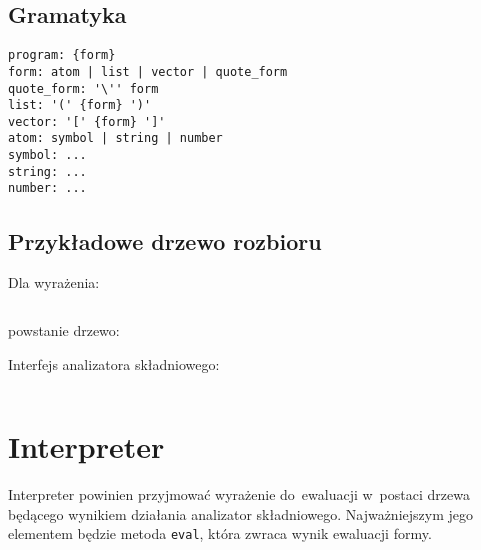 \documentclass[a4paper,11pt]{article}
\newcommand{\clj}[1]{\inputminted[fontsize=\footnotesize]{clojure}{code/#1.clj}}
\newcommand{\impl}[1]{\inputminted[fontsize=\footnotesize]{java}{impl/#1.java}}
\begin{document}
\subsection{Gramatyka}

\begin{verbatim}
program: {form}
form: atom | list | vector | quote_form
quote_form: '\'' form
list: '(' {form} ')'
vector: '[' {form} ']'
atom: symbol | string | number
symbol: ...
string: ...
number: ...
\end{verbatim}

\subsection{Przykładowe drzewo rozbioru}

Dla wyrażenia:
\clj{fact}

powstanie drzewo:



Interfejs analizatora składniowego:
\impl{Parser}

\section{Interpreter}

Interpreter powinien przyjmować wyrażenie do~ewaluacji w~postaci drzewa
będącego wynikiem działania analizator składniowego. Najważniejszym jego
elementem będzie metoda \verb+eval+, która zwraca wynik ewaluacji formy.
\end{document}
